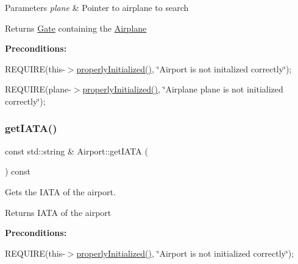 \begin{DoxyParams}{Parameters}
{\em plane} & Pointer to airplane to search \\
\hline
\end{DoxyParams}
\begin{DoxyReturn}{Returns}
\mbox{\hyperlink{class_gate}{Gate}} containing the \mbox{\hyperlink{class_airplane}{Airplane}}
\end{DoxyReturn}
{\bfseries Preconditions\+:}
\begin{DoxyItemize}
\item R\+E\+Q\+U\+I\+RE(this-\/$>$\mbox{\hyperlink{class_airport_aa13e68ac58e8875837fbe888325cfff6}{properly\+Initialized()}}, \char`\"{}\+Airport is not initalized correctly\char`\"{});
\item R\+E\+Q\+U\+I\+RE(plane-\/$>$\mbox{\hyperlink{class_airport_aa13e68ac58e8875837fbe888325cfff6}{properly\+Initialized()}}, \char`\"{}\+Airplane \textquotesingle{}plane\textquotesingle{} is not initialized correctly\char`\"{}); 
\end{DoxyItemize}\mbox{\label{class_airport_aa127b88a8221fa23977c4fa6e37eee5b}} 
\subsubsection{\texorpdfstring{get\+I\+A\+T\+A()}{getIATA()}}
{\footnotesize\ttfamily const std\+::string \& Airport\+::get\+I\+A\+TA (\begin{DoxyParamCaption}{ }\end{DoxyParamCaption}) const}



Gets the I\+A\+TA of the airport. 

\begin{DoxyReturn}{Returns}
I\+A\+TA of the airport
\end{DoxyReturn}
{\bfseries Preconditions\+:}
\begin{DoxyItemize}
\item R\+E\+Q\+U\+I\+RE(this-\/$>$\mbox{\hyperlink{class_airport_aa13e68ac58e8875837fbe888325cfff6}{properly\+Initialized()}}, \char`\"{}\+Airport is not initialized correctly\char`\"{}); 
\end{DoxyItemize}\mbox{\label{class_airport_ab7f1095f9c7bf4940bd5b375fa8a5fc4}} 
